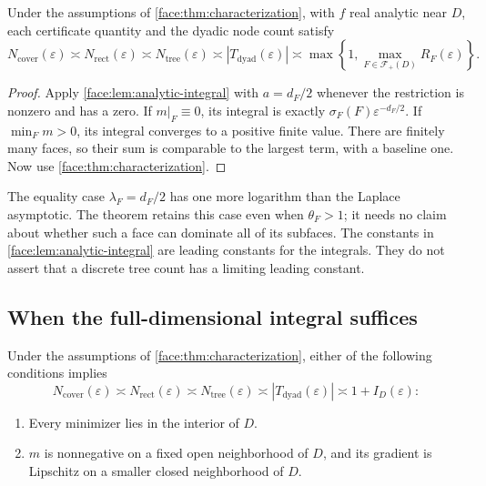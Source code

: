 \begin{corollary}
 \label{face:cor:analytic-rate}
Under the assumptions of \cref{face:thm:characterization}, with $f$
real analytic near $D$, each certificate quantity and the dyadic node
count satisfy
\begin{equation}
 \label{face:eq:analytic-rate}
 N_{\mathrm{cover}}(\varepsilon)
 \asymp N_{\mathrm{rect}}(\varepsilon)
 \asymp N_{\mathrm{tree}}(\varepsilon)
 \asymp |T_{\mathrm{dyad}}(\varepsilon)|
 \asymp \max\left\{1,\max_{F\in\mathcal F_+(D)}R_F(\varepsilon)\right\}.
\end{equation}
\end{corollary}

\begin{proof}
Apply \cref{face:lem:analytic-integral} with $a=d_F/2$ whenever the
restriction is nonzero and has a zero.  If $m|_F\equiv0$, its integral
is exactly $\sigma_F(F)\varepsilon^{-d_F/2}$.  If $\min_Fm>0$, its
integral converges to a positive finite value.  There are finitely many
faces, so their sum is comparable to the largest term, with a baseline
one.  Now use \cref{face:thm:characterization}.
\end{proof}

The equality case $\lambda_F=d_F/2$ has one more logarithm than the
Laplace asymptotic.  The theorem retains this case even when
$\theta_F>1$; it needs no claim about whether such a face can dominate
all of its subfaces.  The constants in
\cref{face:lem:analytic-integral} are leading constants for the
integrals.  They do not assert that a discrete tree count has a limiting
leading constant.

\subsection{When the full-dimensional integral suffices}

\begin{proposition}
 \label{face:prop:full-box}
Under the assumptions of \cref{face:thm:characterization}, either of the
following conditions implies
\begin{equation}
 \label{face:eq:full-box}
 N_{\mathrm{cover}}(\varepsilon)
 \asymp N_{\mathrm{rect}}(\varepsilon)
 \asymp N_{\mathrm{tree}}(\varepsilon)
 \asymp |T_{\mathrm{dyad}}(\varepsilon)|
 \asymp 1+I_D(\varepsilon):
\end{equation}
\begin{enumerate}[label=(\roman*)]
 \item Every minimizer lies in the interior of $D$.
 \item $m$ is nonnegative on a fixed open neighborhood of $D$, and its
 gradient is Lipschitz on a smaller closed neighborhood of $D$.
\end{enumerate}
\end{proposition}


